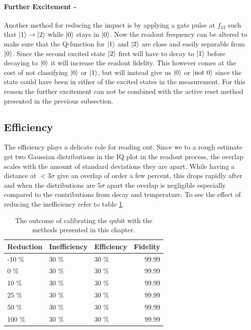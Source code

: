 \paragraph{Further Excitement - } Another method for reducing the impact is by applying a gate pulse at $f_{12}$ such that $\ket{1}\to\ket{2}$ while $\ket{0}$ stays in $\ket{0}$. Now the readout frequency can be altered to make sure that the Q-function for $\ket{1}$ and $\ket{2}$ are close and easily separable from $\ket{0}$. Since the second excited state $\ket{2}$ first will have to decay to $\ket{1}$ before decaying to $\ket{0}$  it will increase the readout fidelity. This however comes at the cost of not classifying $\ket{0}$ or $\ket{1}$, but will instead give us $\ket{0}$ or $\ket{\text{not }0}$ since the state could have been in either of the excited states in the measurement. For this reason the further excitement can not be combined with the active reset method presented in the previous subsection.

\subsection{Efficiency}
The efficiency plays a delicate role for reading out. Since we to a rough estimate get two Gaussian distributions in the IQ plot in the readout process, the overlap scales with the amount of standard deviations they are apart. While having a distance at $< 3\sigma$ give an overlap of order a few percent, this drops rapidly after and when the distributions are $5 \sigma$ apart the overlap is negligible especially compared to the contributions from decay and temperature. To see the effect of reducing the inefficiency refer to table \ref{tab:readout_infidelity_contribution_estimation}. 

\begin{table}[h]
\centering
\caption{The outcome of calibrating the qubit with the methods presented in this chapter.}
\begin{tabular}{lll|r}
\hline
\textbf{Reduction}        & Inefficiency    & Efficiency                    & Fidelity\\ \hline
-10 \%                    &  30 \%          &  30 \%                        &  99.99\\
0   \%                    &  30 \%          &  30 \%                        &  99.99\\
10  \%                    &  30 \%          &  30 \%                        &  99.99\\
25  \%                    &  30 \%          &  30 \%                        &  99.99\\
50  \%                    &  30 \%          &  30 \%                        &  99.99\\
100 \%                    &  30 \%          &  30 \%                        &  99.99\\
\end{tabular}
\label{tab:readout_infidelity_contribution_estimation}
\end{table}

